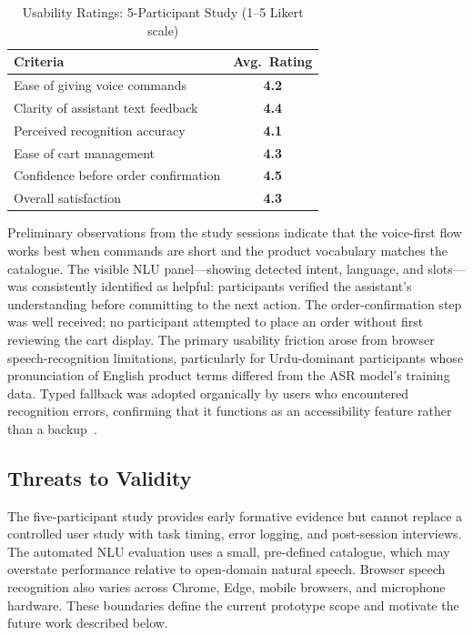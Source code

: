 \documentclass[conference]{IEEEtran}
\begin{document}
\begin{table}[t]
\caption{Usability Ratings: 5-Participant Study (1--5 Likert scale)}
\label{tab:usability}
\centering
\renewcommand{\arraystretch}{1.1}
\begin{tabular}{p{} c}
\toprule
\textbf{Criteria} & \textbf{Avg.\ Rating} \\
\midrule
Ease of giving voice commands         & \textbf{4.2} \\
Clarity of assistant text feedback    & \textbf{4.4} \\
Perceived recognition accuracy        & \textbf{4.1} \\
Ease of cart management               & \textbf{4.3} \\
Confidence before order confirmation  & \textbf{4.5} \\
Overall satisfaction                  & \textbf{4.3} \\
\bottomrule
\end{tabular}
\end{table}

Preliminary observations from the study sessions indicate that the
voice-first flow works best when commands are short and the product
vocabulary matches the catalogue. The visible NLU panel---showing
detected intent, language, and slots---was consistently identified as
helpful: participants verified the assistant's understanding before
committing to the next action. The order-confirmation step was well
received; no participant attempted to place an order without first
reviewing the cart display. The primary usability friction arose from
browser speech-recognition limitations, particularly for Urdu-dominant
participants whose pronunciation of English product terms differed from
the ASR model's training data. Typed fallback was adopted organically
by users who encountered recognition errors, confirming that it
functions as an accessibility feature rather than a
backup~\cite{doke2024emergent,vtyurina2017conversational,
masina2020accessibility}.

\subsection{Threats to Validity}

The five-participant study provides early formative evidence but cannot
replace a controlled user study with task timing, error logging, and
post-session interviews. The automated NLU evaluation uses a small,
pre-defined catalogue, which may overstate performance relative to
open-domain natural speech. Browser speech recognition also varies
across Chrome, Edge, mobile browsers, and microphone hardware. These
boundaries define the current prototype scope and motivate the future
work described below.
\end{document}
